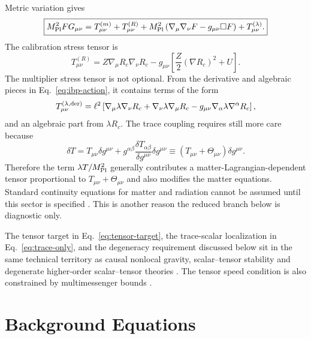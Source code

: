 \documentclass[12pt,a4paper]{article}
\begin{document}
Metric variation gives
\begin{equation}
\boxed{
M_{\rm Pl}^2F G_{\mu\nu}
=T_{\mu\nu}^{(m)}+T_{\mu\nu}^{(R)}
+M_{\rm Pl}^2\left(\nabla_\mu\nabla_\nu F-g_{\mu\nu}\Box F\right)
+T_{\mu\nu}^{(\lambda)}.
}
\label{eq:metric-equation}
\end{equation}
The calibration stress tensor is
\begin{equation}
T_{\mu\nu}^{(R)}=Z\nabla_\mu R_c\nabla_\nu R_c
-g_{\mu\nu}\left[\frac{Z}{2}(\nabla R_c)^2+U\right].
\label{eq:TR}
\end{equation}
The multiplier stress tensor is not optional. From the derivative and algebraic pieces in Eq.~\eqref{eq:ibp-action}, it contains terms of the form
\begin{equation}
T_{\mu\nu}^{(\lambda,{\rm der})}
=\ell^2\left[
\nabla_\mu\lambda\nabla_\nu R_c+\nabla_\nu\lambda\nabla_\mu R_c
-g_{\mu\nu}\nabla_\alpha\lambda\nabla^\alpha R_c
\right],
\label{eq:Tlambda-der}
\end{equation}
and an algebraic part from $\lambda R_c$. The trace coupling requires still more care because
\begin{equation}
\delta T=T_{\mu\nu}\delta g^{\mu\nu}
+g^{\alpha\beta}\frac{\delta T_{\alpha\beta}}{\delta g^{\mu\nu}}\delta g^{\mu\nu}
\equiv \left(T_{\mu\nu}+\Theta_{\mu\nu}\right)\delta g^{\mu\nu}.
\label{eq:Theta}
\end{equation}
Therefore the term $\lambda T/M_{\rm Pl}^2$ generally contributes a matter-Lagrangian-dependent tensor proportional to $T_{\mu\nu}+\Theta_{\mu\nu}$ and also modifies the matter equations. Standard continuity equations for matter and radiation cannot be assumed until this sector is specified \citep{Harko2011,NojiriOdintsov2011}. This is another reason the reduced branch below is diagnostic only.

The tensor target in Eq.~\eqref{eq:tensor-target}, the trace-scalar localization in Eq.~\eqref{eq:trace-only}, and the degeneracy requirement discussed below sit in the same technical territory as causal nonlocal gravity, scalar--tensor stability and degenerate higher-order scalar--tensor theories \citep{MaggioreMancarella2014,FoffaMaggiore2014,Woodard2014,Langlois2016,DHOST2018}. The tensor speed condition is also constrained by multimessenger bounds \citep{CreminelliVernizzi2017,EzquiagaZumalacarregui2017}.

\section{Background Equations}
\end{document}
